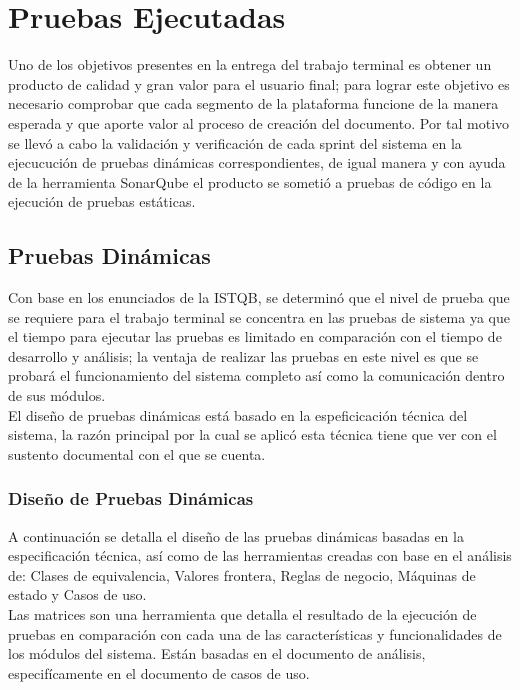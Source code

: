 \chapter{Pruebas Ejecutadas} \label{cap:ocho}
Uno de los objetivos presentes en la entrega del trabajo terminal es obtener un producto de calidad y gran valor para el usuario final; para lograr este objetivo es necesario comprobar que cada segmento de la plataforma funcione de la manera esperada y que aporte valor al proceso de creación del documento. Por tal motivo se llevó a cabo la validación y verificación de cada sprint del sistema en la ejecucución de pruebas dinámicas correspondientes, de igual manera y con ayuda de la herramienta SonarQube el producto se sometió a pruebas de código en la ejecución de pruebas estáticas.

\section{Pruebas Dinámicas}

Con base en los enunciados de la ISTQB, se determinó que el nivel de prueba que se requiere para el trabajo terminal se concentra en las pruebas de sistema ya que el tiempo para ejecutar las pruebas es limitado en comparación con el tiempo de desarrollo y análisis; la ventaja de realizar las pruebas en este nivel es que se probará el funcionamiento del sistema completo así como la comunicación dentro de sus módulos.\\

El diseño de pruebas dinámicas está basado en la espeficicación técnica del sistema, la razón principal por la cual se aplicó esta técnica tiene que ver con el sustento documental con el que se cuenta.\\

\subsection{Diseño de Pruebas Dinámicas}

A continuación se detalla el diseño de las pruebas dinámicas basadas en la especificación técnica, así como de las herramientas creadas con base en el análisis de: Clases de equivalencia, Valores frontera, Reglas de negocio, Máquinas de estado y Casos de uso.\\

Las matrices son una herramienta que detalla el resultado de la ejecución de pruebas en comparación con cada una de las características y funcionalidades de los módulos del sistema. Están basadas en el documento de análisis, especifícamente en el documento de casos de uso.\\

